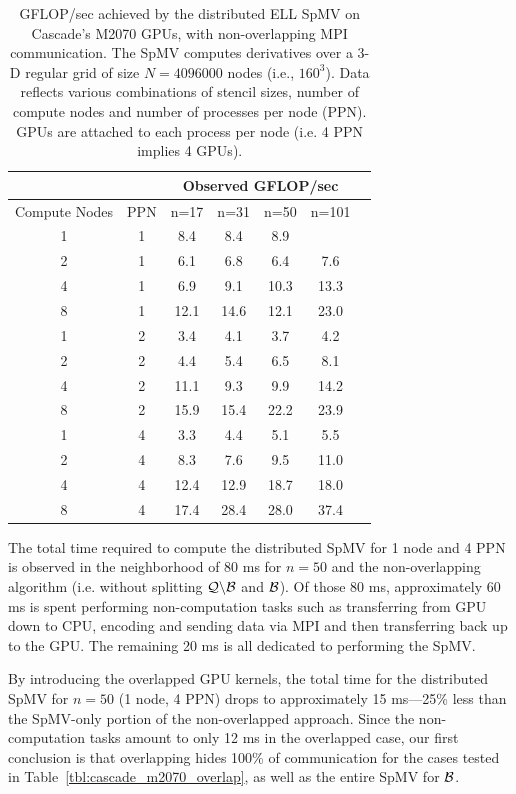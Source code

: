 \begin{table}[htb]
\centering
\caption{GFLOP/sec achieved by the distributed ELL SpMV on Cascade's M2070 GPUs, with non-overlapping MPI communication. The SpMV computes derivatives over a 3-D regular grid of size $N=4096000$ nodes (i.e., $160^3$). Data reflects various combinations of stencil sizes, number of compute nodes and number of processes per node (PPN). GPUs are attached to each process per node (i.e. 4 PPN implies 4 GPUs). }
\label{tbl:cascade_m2070_nonoverlap}
\begin{tabular}{c|c|c|c|c|c|c}
 \multicolumn{2}{c}{ } & \multicolumn{4}{|c|}{Observed GFLOP/sec} \\  \hline
Compute Nodes   &   PPN  &   n=17   &   n=31   &   n=50   &   n=101   \\ \hline
1  &  1  &  8.4  &  8.4  &  8.9  &   \\
2  &  1  &  6.1  &  6.8  &  6.4  &  7.6 \\
4  &  1  &  6.9  &  9.1  &  10.3  &  13.3 \\
8  &  1  &  12.1  &  14.6  &  12.1  &  23.0 \\ \hline
1  &  2  &  3.4  &  4.1  &  3.7  &  4.2 \\
2  &  2  &  4.4  &  5.4  &  6.5  &  8.1 \\
4  &  2  &  11.1  &  9.3  &  9.9  &  14.2 \\
8  &  2  &  15.9  &  15.4  &  22.2  &  23.9 \\ \hline
1  &  4  &  3.3  &  4.4  &  5.1  &  5.5 \\
2  &  4  &  8.3  &  7.6  &  9.5  &  11.0 \\
4  &  4  &  12.4  &  12.9  &  18.7  &  18.0 \\
8  &  4  &  17.4  &  28.4  &  28.0  &  37.4 
\end{tabular} 
\end{table}


The total time required to compute the distributed SpMV for 1 node and 4 PPN is observed in the neighborhood of 80 ms for $n=50$ and the non-overlapping algorithm (i.e. without splitting $\mathcal{Q} \backslash \mathcal{B}$ and $\mathcal{B}$). Of those 80 ms, approximately 60 ms is spent performing non-computation tasks such as transferring from GPU down to CPU, encoding and sending data via MPI and then transferring back up to the GPU. The remaining 20 ms is all dedicated to performing the SpMV.

By introducing the overlapped GPU kernels, the total time for the distributed SpMV for $n=50$ (1 node, 4 PPN) drops to approximately 15 ms---25\% less than the SpMV-only portion of the non-overlapped approach. Since the non-computation tasks amount to only 12 ms in the overlapped case, our first conclusion is that overlapping hides 100\% of communication for the cases tested in Table~\ref{tbl:cascade_m2070_overlap}, as well as the entire SpMV for $\mathcal{B}$. 

